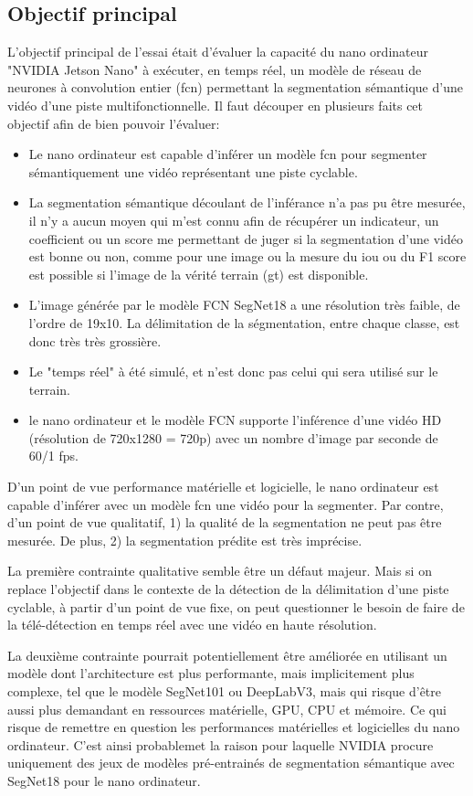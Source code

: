 \subsection{Objectif principal}
\par L'objectif principal de l'essai était d'évaluer la capacité du nano ordinateur "NVIDIA Jetson Nano" à exécuter, en temps réel, un modèle de réseau de neurones à convolution entier (\acrshort{fcn}) permettant la segmentation sémantique d'une vidéo d'une piste multifonctionnelle. Il faut découper en plusieurs faits cet objectif afin de bien pouvoir l'évaluer: 
\begin{itemize}
   \item Le nano ordinateur est capable d'inférer un modèle \acrshort{fcn} pour segmenter sémantiquement une vidéo représentant une piste cyclable. 
   \item La segmentation sémantique découlant de l'inférance n'a pas pu être mesurée, il n'y a aucun moyen qui m'est connu afin de récupérer un indicateur, un coefficient ou un score me permettant de juger si la segmentation d'une vidéo est bonne ou non, comme pour une image ou la mesure du \acrshort{iou} ou du F1 score est possible si l'image de la vérité terrain (\acrshort{gt}) est disponible. 
   \item L'image générée par le modèle FCN SegNet18 a une résolution très faible, de l'ordre de 19x10. La délimitation de la ségmentation, entre chaque classe, est donc très très grossière.
   \item Le "temps réel" à été simulé, et n'est donc pas celui qui sera utilisé sur le terrain. 
   \item le nano ordinateur et le modèle FCN supporte l'inférence d'une vidéo HD (résolution de 720x1280 = 720p) avec un nombre d'image par seconde de 60/1 \acrshort{fps}.
\end{itemize}   
\par D'un point de vue performance matérielle et logicielle, le nano ordinateur est capable d'inférer avec un modèle \acrshort{fcn} une vidéo pour la segmenter. Par contre, d'un point de vue qualitatif, 1) la qualité de la segmentation ne peut pas être mesurée. De plus, 2) la segmentation prédite est très imprécise.
\par La première contrainte qualitative semble être un défaut majeur. Mais si on replace l'objectif dans le contexte de la détection de la délimitation d'une piste cyclable, à partir d'un point de vue fixe, on peut questionner le besoin de faire de la télé-détection en temps réel avec une vidéo en haute résolution.
\par La deuxième  contrainte pourrait potentiellement être améliorée en utilisant un modèle dont l'architecture est plus performante, mais implicitement plus complexe, tel que le modèle SegNet101 ou DeepLabV3, mais qui risque d'être aussi plus demandant en ressources matérielle, GPU, CPU et mémoire. Ce qui risque de remettre en question les performances matérielles et logicielles du nano ordinateur. C'est ainsi probablemet la raison pour laquelle NVIDIA procure uniquement des jeux de modèles pré-entrainés de segmentation sémantique avec SegNet18 pour le nano ordinateur. 
